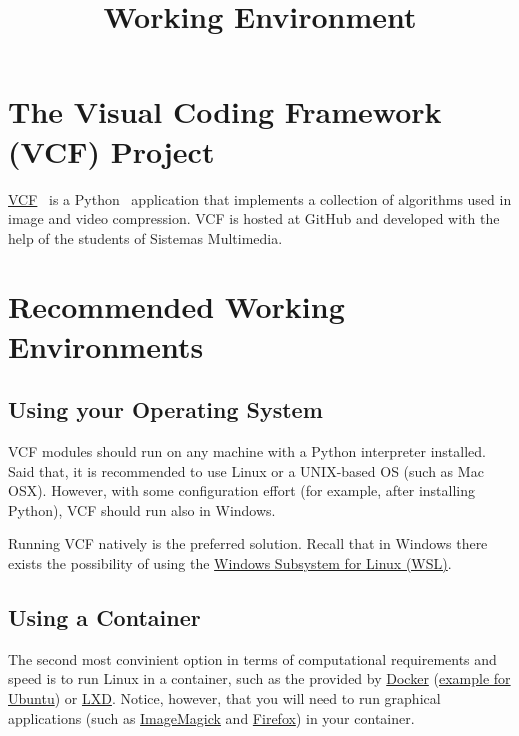 

\title{Working Environment}

\maketitle

\tableofcontents

\section{The Visual Coding Framework (VCF) Project}
\href{https://github.com/Sistemas-Multimedia/VCF}{VCF}~\cite{vruiz__VCF}
is a Python~\cite{python} application that implements a collection of
algorithms used in image and video compression. VCF is hosted at
GitHub and developed with the help of the students of Sistemas
Multimedia.

\section{Recommended Working Environments}

\subsection{Using your Operating System}
VCF modules should run on any machine with a Python interpreter
installed. Said that, it is recommended to use Linux or a
UNIX-based OS (such as Mac OSX). However, with some configuration effort
(for example, after installing Python), VCF should run also in
Windows.

Running VCF natively is the preferred solution. Recall that in Windows
there exists the possibility of using the
\href{https://learn.microsoft.com/en-us/windows/wsl/install}{Windows
  Subsystem for Linux (WSL)}.

\subsection{Using a Container}
The second most convinient option in terms of computational
requirements and speed is to run Linux in a container, such
as the provided by \href{https://hub.docker.com/}{Docker}
(\href{https://hub.docker.com/_/ubuntu}{example for Ubuntu})
or \href{https://linuxcontainers.org/}{LXD}. Notice, however, that you
will need to run graphical applications (such
as \href{https://linuxcontainers.org/}{ImageMagick}
and \href{https://www.mozilla.org/firefox}{Firefox}) in your
container.

